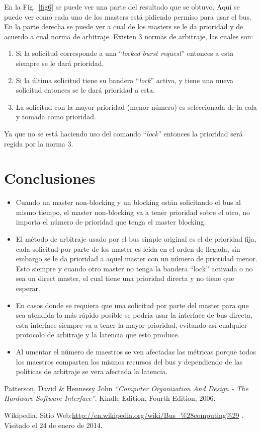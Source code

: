 \documentclass[twocolumn]{IEEEtran}
\begin{document}
\noindent
En la Fig.~\ref{fig6} se puede ver una parte del resultado que se obtuvo. Aquí se puede ver como cada uno de los masters está pidiendo permiso para usar el bus. En la parte derecha se puede ver a cual de los masters se le da prioridad y de acuerdo a cual norma de arbitraje. Existen 3 normas de arbitraje, las cuales son: 
\begin{enumerate}
 \item Si la solicitud corresponde a una ``\textit{locked burst request}'' entonces a esta siempre se le dará prioridad.
 \item Si la última solicitud tiene su bandera ``\textit{lock}'' activa, y tiene una nueva solicitud  entonces se le dará prioridad a esta. 
 \item La solicitud con la mayor prioridad (menor número) es seleccionada de la cola y tomada como prioridad. 
\end{enumerate}
\noindent
Ya que no se está haciendo uso del comando ``\textit{lock}'' entonces la prioridad será regida por la norma 3. 

\section{Conclusiones}
\begin{itemize}
 \item Cuando un master non-blocking y un blocking están solicitando el bus al mismo tiempo, el master non-blocking va a tener prioridad sobre el otro, no importa el número de prioridad que tenga el master blocking. 
 \item El método de arbitraje usado por el bus simple original es el de prioridad fija, cada solicitud por parte de los master es leída en el orden de llegada, sin embargo se le da prioridad a aquel master con un número de prioridad menor. Esto siempre y cuando otro master no tenga la bandera “lock” activada o no sea un direct master, el cual tiene una prioridad directa y no tiene que esperar.
 \item En casos donde se requiera que una solicitud por parte del master para que sea atendida lo más rápido posible se podría usar la interface de bus directa, esta interface siempre va a tener la mayor prioridad, evitando así cualquier protocolo de arbitraje y la latencia que esto produce.
 \item Al umentar el número de maestros se ven afectadas las métricas porque todos los maestros comparten los mismos recursos del bus y dependiendo de las politicas de arbitraje se vera afectada la latencia.
\end{itemize}


\begin{thebibliography}{99}
 Patterson, David \& Hennessy John
{\em "`Computer Organization And Design - The Hardware-Software Interface"'}.
Kindle Edition, Fourth Edition, 2006.

 Wikipedia. Sitio Web:\url{http://en.wikipedia.org/wiki/Bus_%28computing%29}
 . Visitado el 24 de enero de 2014.
\end{thebibliography}
\end{document}
